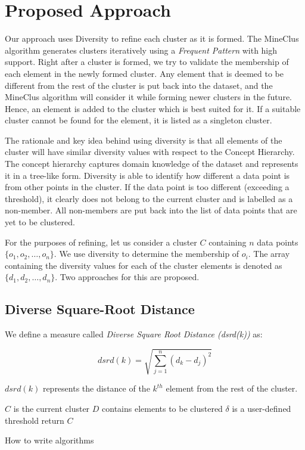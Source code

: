 \chapter{Proposed Approach}
\label{Chapter4}

Our approach uses Diversity to refine each cluster as it is formed. The MineClus algorithm generates clusters iteratively using a \emph{Frequent Pattern} with high support.
Right after a cluster is formed, we try to validate the membership of each element in the newly formed cluster. Any element that is deemed to be different from the rest of the cluster is put back into the dataset, and the MineClus algorithm will consider it while forming newer clusters in the future. Hence, an element is added to the cluster which is best suited for it. If a suitable cluster cannot be found for the element, it is listed as a singleton cluster.

The rationale and key idea behind using diversity is that all elements of the cluster will have similar diversity values with respect to the Concept Hierarchy. The concept hierarchy captures domain knowledge of the dataset and represents it in a tree-like form.
Diversity is able to identify how different a data point
is from other points in the cluster. If the data point
is too different (exceeding a threshold), it clearly does not belong to the current cluster and is labelled as a non-member.
All non-members are put back into the list of data points that are yet to be clustered.

For the purposes of refining, let us consider a cluster \(C\) containing \(n\) data points \(\{o_1, o_2, \dots, o_n \}\). We use diversity to determine the membership of \(o_i\). The array containing the diversity values for each of the cluster elements is denoted as \(\{d_1, d_2, \dots, d_n\}\). Two approaches for this are proposed.

\section{Diverse Square-Root Distance}

We define a measure called \emph{Diverse Square Root Distance (dsrd(k))} as:

\begin{equation}
dsrd(k) = \sqrt{\sum_{j=1}^{n} {(d_k - d_j)}^2}
\end{equation}

\(dsrd(k)\) represents the distance of the \(k^{th}\) element from the rest of the cluster.

\begin{algorithm}[H]
$C$ is the current cluster\;
$D$ contains elements to be clustered\;
$\delta$ is a user-defined threshold\;
return $C$\;
 \caption{How to write algorithms}
\end{algorithm}
